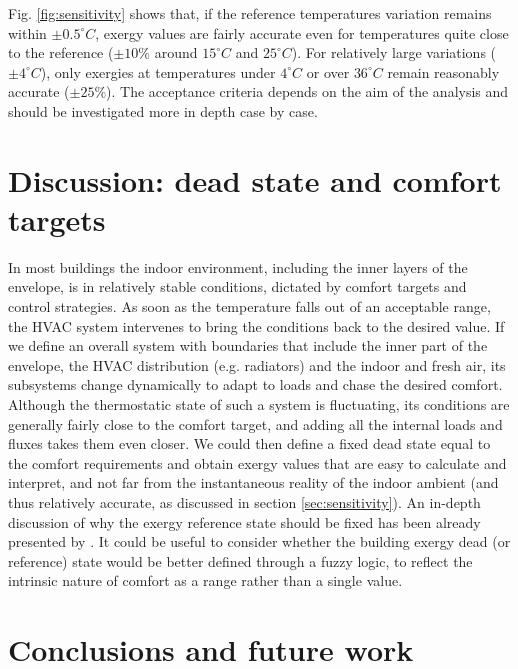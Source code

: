 \documentclass[10pt]{extarticle} %
\begin{document}
\vfill \break


\noindent Fig. \ref{fig:sensitivity} shows that, if the reference temperatures variation remains within $\pm 0.5^\circ C$, exergy values are fairly accurate even for temperatures quite close to the reference ($\pm 10 \%$ around $15^\circ C$ and $25^\circ C$). For relatively large variations ($\pm 4^\circ C$), only exergies at temperatures under $4^\circ C$ or over $36^\circ C$ remain reasonably accurate ($\pm 25 \%$). The acceptance criteria depends on the aim of the analysis and should be investigated more in depth case by case. 

\section{Discussion: dead state and comfort targets} 

In most buildings the indoor environment, including the inner layers of the envelope, is in relatively stable conditions, dictated by comfort targets and control strategies. As soon as the temperature falls out of an acceptable range, the HVAC system intervenes to bring the conditions back to the desired value. If we define an overall system with boundaries that include the inner part of the envelope, the HVAC distribution (e.g. radiators) and the indoor and fresh air, its subsystems change dynamically to adapt to loads and chase the desired comfort. Although the thermostatic state of such a system is fluctuating, its conditions are generally fairly close to the comfort target, and adding all the internal loads and fluxes takes them even closer. We could then define a fixed dead state equal to the comfort requirements and obtain exergy values that are easy to calculate and interpret, and not far from the instantaneous reality of the indoor ambient (and thus relatively accurate, as discussed in section \ref{sec:sensitivity}). An in-depth discussion of why the exergy reference state should be fixed has been already presented by \cite{Pons2019}. It could be useful to consider whether the building exergy dead (or reference) state would be better defined through a fuzzy logic, to reflect the intrinsic nature of comfort as a range rather than a single value.



\section{Conclusions and future work}
\end{document}
